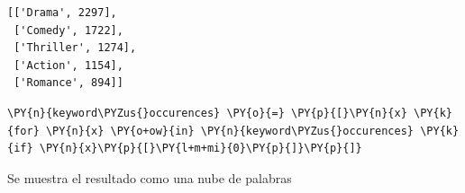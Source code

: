             \begin{tcolorbox}[breakable, boxrule=.5pt, size=fbox, pad at break*=1mm, opacityfill=0]
\begin{Verbatim}[commandchars=\\\{\}]
[['Drama', 2297],
 ['Comedy', 1722],
 ['Thriller', 1274],
 ['Action', 1154],
 ['Romance', 894]]
\end{Verbatim}
\end{tcolorbox}
        
    \begin{tcolorbox}[breakable, size=fbox, boxrule=1pt, pad at break*=1mm,colback=cellbackground, colframe=cellborder]
\begin{Verbatim}[commandchars=\\\{\}]
\PY{n}{keyword\PYZus{}occurences} \PY{o}{=} \PY{p}{[}\PY{n}{x} \PY{k}{for} \PY{n}{x} \PY{o+ow}{in} \PY{n}{keyword\PYZus{}occurences} \PY{k}{if} \PY{n}{x}\PY{p}{[}\PY{l+m+mi}{0}\PY{p}{]}\PY{p}{]}
\end{Verbatim}
\end{tcolorbox}

    Se muestra el resultado como una nube de palabras

